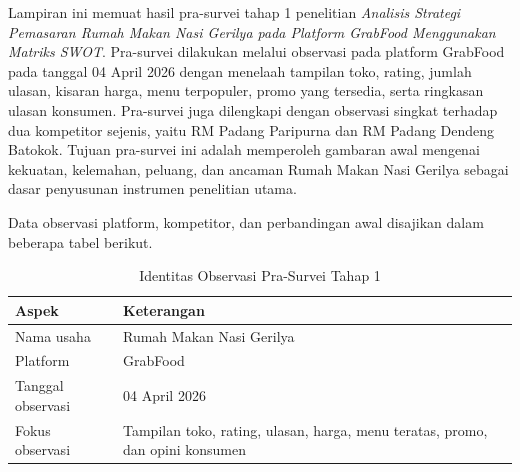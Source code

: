 \label{app:prasurvey1}

Lampiran ini memuat hasil pra-survei tahap 1 penelitian \textit{Analisis Strategi Pemasaran Rumah Makan Nasi Gerilya pada Platform GrabFood Menggunakan Matriks SWOT}. Pra-survei dilakukan melalui observasi pada platform GrabFood pada tanggal 04 April 2026 dengan menelaah tampilan toko, rating, jumlah ulasan, kisaran harga, menu terpopuler, promo yang tersedia, serta ringkasan ulasan konsumen. Pra-survei juga dilengkapi dengan observasi singkat terhadap dua kompetitor sejenis, yaitu RM Padang Paripurna dan RM Padang Dendeng Batokok. Tujuan pra-survei ini adalah memperoleh gambaran awal mengenai kekuatan, kelemahan, peluang, dan ancaman Rumah Makan Nasi Gerilya sebagai dasar penyusunan instrumen penelitian utama.

Data observasi platform, kompetitor, dan perbandingan awal disajikan dalam beberapa tabel berikut.

\begin{table}[h!]
    \centering
    \caption{Identitas Observasi Pra-Survei Tahap 1}
    \label{tab:identitas_prasurvey1}
    \begin{tabularx}{\textwidth}{lY}
        \toprule
        \textbf{Aspek}    & \textbf{Keterangan}                                                           \\
        \midrule
        Nama usaha        & Rumah Makan Nasi Gerilya                                                      \\
        Platform          & GrabFood                                                                      \\
        Tanggal observasi & 04 April 2026                                                                 \\
        Fokus observasi   & Tampilan toko, rating, ulasan, harga, menu teratas, promo, dan opini konsumen \\
        \bottomrule
    \end{tabularx}
\end{table}

